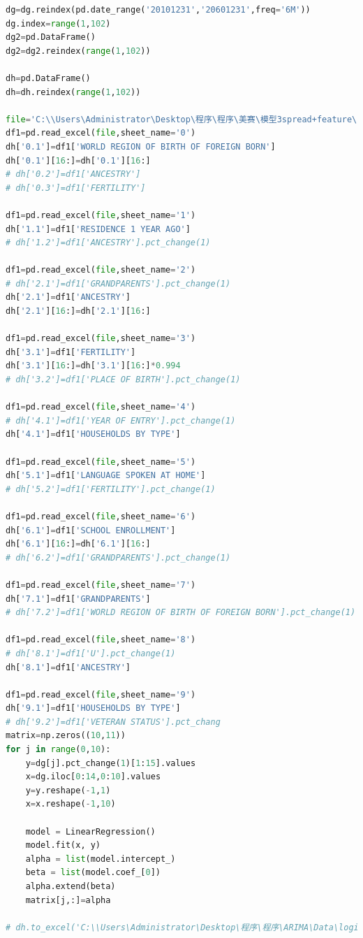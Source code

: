 \documentclass[12pt]{article}
\begin{document}
\begin{appendices}
\begin{lstlisting}[language={python}, caption=\texttt{Modified LVM Model}]
dg=dg.reindex(pd.date_range('20101231','20601231',freq='6M'))
dg.index=range(1,102)
dg2=pd.DataFrame()
dg2=dg2.reindex(range(1,102))

dh=pd.DataFrame()
dh=dh.reindex(range(1,102))

file='C:\\Users\Administrator\Desktop\程序\程序\美赛\模型3spread+feature\Data\\forecast_entropy.xlsx'
df1=pd.read_excel(file,sheet_name='0')
dh['0.1']=df1['WORLD REGION OF BIRTH OF FOREIGN BORN']
dh['0.1'][16:]=dh['0.1'][16:]
# dh['0.2']=df1['ANCESTRY']
# dh['0.3']=df1['FERTILITY']

df1=pd.read_excel(file,sheet_name='1')
dh['1.1']=df1['RESIDENCE 1 YEAR AGO']
# dh['1.2']=df1['ANCESTRY'].pct_change(1)

df1=pd.read_excel(file,sheet_name='2')
# dh['2.1']=df1['GRANDPARENTS'].pct_change(1)
dh['2.1']=df1['ANCESTRY']
dh['2.1'][16:]=dh['2.1'][16:]

df1=pd.read_excel(file,sheet_name='3')
dh['3.1']=df1['FERTILITY']
dh['3.1'][16:]=dh['3.1'][16:]*0.994
# dh['3.2']=df1['PLACE OF BIRTH'].pct_change(1)

df1=pd.read_excel(file,sheet_name='4')
# dh['4.1']=df1['YEAR OF ENTRY'].pct_change(1)
dh['4.1']=df1['HOUSEHOLDS BY TYPE']

df1=pd.read_excel(file,sheet_name='5')
dh['5.1']=df1['LANGUAGE SPOKEN AT HOME']
# dh['5.2']=df1['FERTILITY'].pct_change(1)

df1=pd.read_excel(file,sheet_name='6')
dh['6.1']=df1['SCHOOL ENROLLMENT']
dh['6.1'][16:]=dh['6.1'][16:]
# dh['6.2']=df1['GRANDPARENTS'].pct_change(1)

df1=pd.read_excel(file,sheet_name='7')
dh['7.1']=df1['GRANDPARENTS']
# dh['7.2']=df1['WORLD REGION OF BIRTH OF FOREIGN BORN'].pct_change(1)

df1=pd.read_excel(file,sheet_name='8')
# dh['8.1']=df1['U'].pct_change(1)
dh['8.1']=df1['ANCESTRY']

df1=pd.read_excel(file,sheet_name='9')
dh['9.1']=df1['HOUSEHOLDS BY TYPE']
# dh['9.2']=df1['VETERAN STATUS'].pct_chang
matrix=np.zeros((10,11))
for j in range(0,10):
    y=dg[j].pct_change(1)[1:15].values
    x=dg.iloc[0:14,0:10].values
    y=y.reshape(-1,1)
    x=x.reshape(-1,10)

    model = LinearRegression()
    model.fit(x, y)
    alpha = list(model.intercept_)
    beta = list(model.coef_[0])
    alpha.extend(beta)
    matrix[j,:]=alpha

# dh.to_excel('C:\\Users\Administrator\Desktop\程序\程序\ARIMA\Data\logistic\\number.xlsx')


\end{lstlisting}
\end{appendices}
\end{document}
